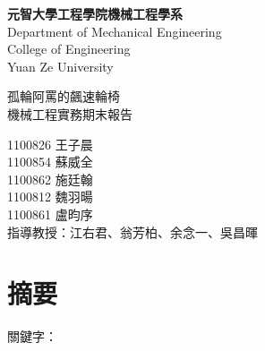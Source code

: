 \documentclass[12pt]{article}       %
\begin{document}
\begin{titlepage}
    \centering
    \vspace*{1cm} %

    {\LARGE \textbf{元智大學工程學院機械工程學系}} \\[0.5cm] %
    {\LARGE {Department of Mechanical Engineering}} \\[0.5cm] %
    {\LARGE {College of Engineering}} \\[0.5cm]
    {\LARGE {Yuan Ze University}}

    \vfill %

    {\LARGE{孤輪阿罵的飆速輪椅}} \\[0.5cm]%
    {\LARGE{機械工程實務期末報告}} %

    \vfill %

    {\LARGE {1100826 王子晨}}\\[0.5cm]
    {\LARGE {1100854 蘇威全}}\\[0.5cm]
    {\LARGE {1100862 施廷翰}}\\[0.5cm]
    {\LARGE {1100812 魏羽暘}}\\[0.5cm]
    {\LARGE {1100861 盧昀序}}\\[2.5cm]
    {\LARGE {指導教授：江右君、翁芳柏、余念一、吳昌暉}}\\[0.5cm]

\end{titlepage}
\newpage

\setcounter{page}{1}  %


\section*{\centering 摘要}  %


\hspace{2em}

\vspace{1.5em}
\noindent 關鍵字：
\newpage  %
\end{document}

